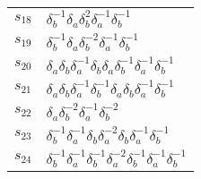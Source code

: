 \documentclass{article}
\begin{document}
\begin{center}
\begin{tabular}{ll}
$s_{18}$ & $\delta_b^{-1}\delta_a^{}\delta_b^{2}\delta_a^{-1}\delta_b^{-1}$ \\
$s_{19}$ & $\delta_b^{-1}\delta_a^{}\delta_b^{-2}\delta_a^{-1}\delta_b^{-1}$ \\
$s_{20}$ & $\delta_a^{}\delta_b^{}\delta_a^{-1}\delta_b^{}\delta_a^{}\delta_b^{-1}\delta_a^{-1}\delta_b^{-1}$ \\
$s_{21}$ & $\delta_a^{}\delta_b^{}\delta_a^{-1}\delta_b^{-1}\delta_a^{}\delta_b^{}\delta_a^{-1}\delta_b^{-1}$ \\
$s_{22}$ & $\delta_a^{}\delta_b^{-2}\delta_a^{-1}\delta_b^{-2}$ \\
$s_{23}$ & $\delta_b^{-1}\delta_a^{-1}\delta_b^{}\delta_a^{-2}\delta_b^{}\delta_a^{-1}\delta_b^{-1}$ \\
$s_{24}$ & $\delta_b^{-1}\delta_a^{-1}\delta_b^{-1}\delta_a^{-2}\delta_b^{-1}\delta_a^{-1}\delta_b^{-1}$ \\
\bottomrule
\end{tabular}
\end{center}

\thispagestyle{empty}
\end{document}
